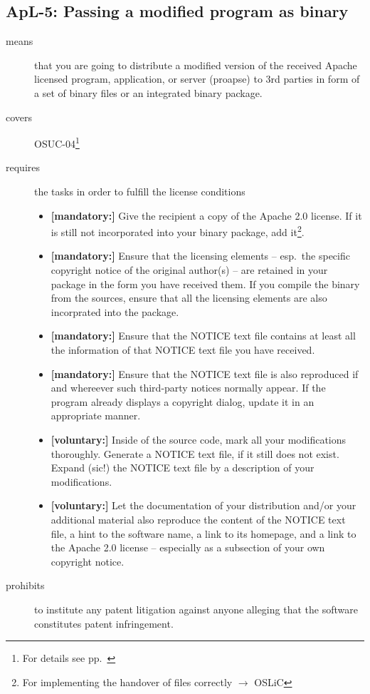 \subsection{ApL-5: Passing a modified program as binary}

\begin{description}
\item[means] that you are going to distribute a modified version of the received
Apache licensed pro\-gram, application, or server (proapse) to 3rd parties in
form of a set of binary files or an integrated binary package.
\item[covers] OSUC-04\footnote{For details see pp.\ \pageref{OSUC-04-DEF}}
\item[requires] the tasks in order to fulfill the license conditions
\begin{itemize}

 \item \textbf{[mandatory:]} Give the recipient a copy of the Apache 2.0
  license. If it is still not incorporated into your binary package, add
  it\footnote{For implementing the handover of files correctly $\rightarrow$
  OSLiC \pageref{DistributingFilesHint}}.
  
  \item \textbf{[mandatory:]} Ensure that the licensing elements -- esp.\ the
  specific copyright notice of the original author(s) -- are retained in your
  package in the form you have received them. If you compile the binary from the
  sources, ensure that all the licensing elements are also incorprated into the
  package.
  
  \item \textbf{[mandatory:]} Ensure that the NOTICE text file contains at least
  all the information of that NOTICE text file you have received.
  
  \item \textbf{[mandatory:]} Ensure that the NOTICE text file is also
  reproduced if and whereever such third-party notices normally appear. If the
  program already displays a copyright dialog, update it in an appropriate
  manner.
 
  \item \textbf{[voluntary:]} Inside of the source code, mark all your
  modifications thoroughly. Generate a NOTICE text file, if it still does not
  exist. Expand (sic!) the NOTICE text file by a description of your
  modifications.
 
  \item \textbf{[voluntary:]} Let the documentation of your distribution
  and/or your additional material also reproduce the content of the NOTICE text
  file, a hint to the software name, a link to its homepage, and a link to the
  Apache 2.0 license -- especially as a subsection of your own copyright notice.

\end{itemize}

\item[prohibits] to institute any patent litigation against anyone alleging that
the software constitutes patent infringement.

\end{description}

